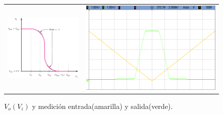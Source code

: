 \begin{figure}[H]
    \centering
    \begin{tabular}{c c}
        \includegraphics[scale=0.45]{../EJ1/Recursos/logic_leves.PNG} &
        \includegraphics[scale=0.23]{../EJ1/Mediciones/Osciloscopio/Segundo_Intento/Voltage_Levels_RTL/cropped_scope_3.png}
    \end{tabular}
    \caption{$V_o(V_i)$ y medici\'on entrada(amarilla) y salida(verde).}
    \label{fig:logic_levels}
\end{figure}


